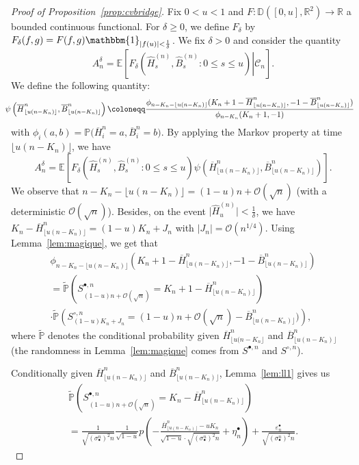\documentclass[10pt]{amsart}
\theoremstyle{definition}\newtheorem{defi}[theo]{Definition}\newtheorem{rema}[theo]{Remark}\newtheorem{exam}[theo]{Example}\newtheorem{exem}[theo]{Example}\newtheorem{nota}[theo]{Notation}
\newcommand{\R}{\mathbb{R}}
\newcommand{\D}{\mathbb{D}}
\def\sbn{\sigma_{\bullet}^{n}}
\def\Sbn{S^{\bullet,n}}
\def\Scn{S^{\circ,n}}
\def\oB{\overline{B}}
\def\hB{\widehat{B}}
\def\oH{\overline{H}}
\def\hH{\widehat{H}}
\renewcommand{\epsilon}{\varepsilon}
\newcommand\Es[1]{\mathbb{E}\left[#1\right]}
\newcommand\tPr[1]{\tilde{\mathbb{P}}\left(#1\right)}
\newcommand\Prb[1]{\mathbb{P}\big(#1\big)}
\begin{document}
\begin{proof}[Proof of Proposition~\ref{prop:cvbridge}]
Fix $0<u<1$ and $F : \D([0,u],\R^{2}) \rightarrow \R$ a bounded continuous functional. For $\delta \geq 0$, we define $F_{\delta}$ by $F_{\delta}(f,g)=F(f,g) \mathbbm{1}_{|f(u)|< \frac{1}{\delta}}$. We fix $\delta>0$ and consider the quantity
\[A^{\delta}_{n}= \Es{ \left. F_{\delta} \left(    \hH^{(n)}_{s},  \hB^{(n)}_{s}: 0 \leq s \leq u \right)
\right| \mathcal{C}_{n}}.\]
We define the following quantity:
\begin{equation}
  \hspace{-3mm} \psi \left( \oH^{n}_{ \lfloor u (n-K_{n}) \rfloor },\oB^{n}_{ \lfloor u (n-K_{n}) \rfloor } \right) \coloneqq \frac{\phi_{n-K_{n}- \lfloor u (n-K_{n}) \rfloor} (K_{n}+1-\oH^{n}_{ \lfloor u (n-K_{n}) \rfloor } ,-1-\oB^{n}_{\lfloor u (n-K_{n}) \rfloor})}{\phi_{n-K_{n}} (K_{n}+1,-1) }
  \label{eq:def_psi}
\end{equation}
with $\phi_{i}(a,b)=\Prb{\oH^{n}_{i}=a,\oB^{n}_{i}=b}$.
By applying the Markov property at time $\lfloor u (n-K_{n}) \rfloor$, we have
\begin{equation}
  A^{\delta}_{n}= \Es{  F_{\delta} \left(   \hH^{(n)}_{s},  \hB^{(n)}_{s}: 0 \leq s \leq u \right) \psi \left( \oH^{n}_{ \lfloor u (n-K_{n}) \rfloor },\oB^{n}_{ \lfloor u (n-K_{n}) \rfloor } \right)  } .
  \label{eq:Adn}
\end{equation}
We observe that $n-K_{n}- \lfloor u (n-K_{n}) \rfloor= (1-u)n+\mathcal O(\sqrt{n})$ (with a deterministic $\mathcal O(\sqrt{n})$).
Besides, on the event $ \big| \hH^{(n)}_{u} \big| < \tfrac{1}{\delta}$,
we have $K_{n}-\oH^{n}_{ \lfloor u (n-K_{n}) \rfloor}=(1-u)K_{n}+J_{n}$ with $|J_{n}|= \mathcal{O}(n^{1/4})$.
Using Lemma~\ref{lem:magique}, we get that
\begin{multline}
 \phi_{n-K_{n}- \lfloor u (n-K_{n}) \rfloor} (K_{n}+1-\oH^{n}_{ \lfloor u (n-K_{n}) \rfloor } ,-1-\oB^{n}_{\lfloor u (n-K_{n}) \rfloor})\\
   = \tPr{\Sbn_{(1-u)n+\mathcal O(\sqrt{n})}=K_{n}+1-\oH^{n}_{ \lfloor u (n-K_{n}) \rfloor}}  \\
   \cdot\tPr{\Scn_{(1-u) K_{n}+ J_{n}}= (1-u)n+\mathcal O(\sqrt{n})-\oB^{n}_{\lfloor u (n-K_{n}) \rfloor})},
   \label{eq:Tech4}
\end{multline}
where $\tilde{\mathbb{P}}$ denotes the conditional probability given $\oH^{n}_{ \lfloor u (n-K_{n} \rfloor}$ and $\oB^{n}_{\lfloor u (n-K_{n})\rfloor}$
(the randomness in Lemma~\ref{lem:magique} comes from $\Sbn$ and $\Scn$).

Conditionally given $\oH^{n}_{ \lfloor u (n-K_{n}) \rfloor }$ and $\oB^{n}_{ \lfloor u (n-K_{n}) \rfloor }$,
Lemma~\ref{lem:ll1} gives us
\begin{multline*}
\tPr{\Sbn_{(1-u)n+\mathcal O(\sqrt{n})}=K_{n}-\oH^{n}_{ \lfloor u (n-K_{n}) \rfloor}}\\
  = \frac{1}{\sqrt{ (\sbn)^{2}  n} } \frac{1}{\sqrt{1-u}} p \left(  -   \frac{\oH^{n}_{ \lfloor u (n-K_{n}) \rfloor } - u K_{n}}{ \sqrt{1-u} \cdot \sqrt{ (\sbn)^{2} n} }  + \eta^{\bullet}_{n}\right) +  \frac{\epsilon^{\bullet}_{n}}{\sqrt{ (\sbn)^{2}  n}}.
\end{multline*}


\end{proof}
\end{document}
